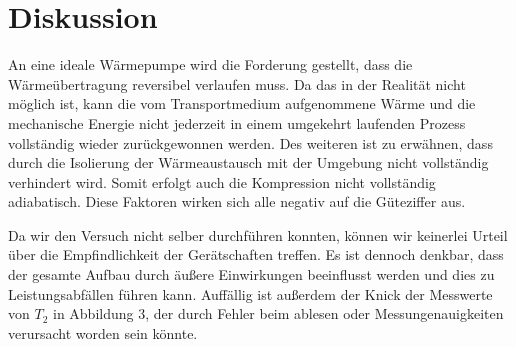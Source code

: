 \section{Diskussion}
\label{sec:Diskussion}
An eine ideale Wärmepumpe wird die Forderung gestellt, dass die Wärmeübertragung reversibel verlaufen muss.
Da das in der Realität nicht möglich ist, kann die vom Transportmedium aufgenommene Wärme 
und die mechanische Energie nicht jederzeit in einem umgekehrt laufenden Prozess vollständig wieder zurückgewonnen werden.
Des weiteren ist zu erwähnen, dass durch die Isolierung der Wärmeaustausch mit der Umgebung nicht vollständig verhindert wird. 
Somit erfolgt auch die Kompression nicht vollständig adiabatisch. 
Diese Faktoren wirken sich alle negativ auf die Güteziffer aus.

Da wir den Versuch nicht selber durchführen konnten, können wir keinerlei Urteil über die Empfindlichkeit der Gerätschaften treffen.
Es ist dennoch denkbar, dass der gesamte Aufbau durch äußere Einwirkungen beeinflusst werden und dies zu Leistungsabfällen führen kann.
Auffällig ist außerdem der Knick der Messwerte von $T_2$ in Abbildung 3, der durch Fehler beim ablesen oder Messungenauigkeiten verursacht worden sein könnte.
